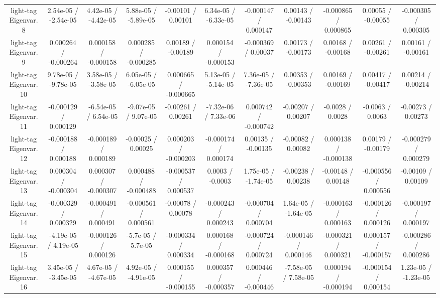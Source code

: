 \begin{table}[htbp]
\begin{center}
\begin{tabular}{|c|c|c|c|c|c|c|c|c|c|c|}
  light-tag Eigenvar. 8 & 2.54e-05 / -2.54e-05 & 4.42e-05 / -4.42e-05 & 5.88e-05 / -5.89e-05 & -0.00101 / 0.00101 & 6.34e-05 / -6.33e-05 & -0.000147 / 0.000147 & 0.00143 / -0.00143 & -0.000865 / 0.000865 & 0.00055 / -0.00055 & -0.000305 / 0.000305 \\ 
  light-tag Eigenvar. 9 & 0.000264 / -0.000264 & 0.000158 / -0.000158 & 0.000285 / -0.000285 & 0.00189 / -0.00189 & 0.000154 / -0.000153 & -0.000369 / 0.00037 & 0.00173 / -0.00173 & 0.00168 / -0.00168 & 0.00261 / -0.00261 & 0.00161 / -0.00161 \\ 
  light-tag Eigenvar. 10 & 9.78e-05 / -9.78e-05 & 3.58e-05 / -3.58e-05 & 6.05e-05 / -6.05e-05 & 0.000665 / -0.000665 & 5.13e-05 / -5.14e-05 & 7.36e-05 / -7.36e-05 & 0.00353 / -0.00353 & 0.00169 / -0.00169 & 0.00417 / -0.00417 & 0.00214 / -0.00214 \\ 
  light-tag Eigenvar. 11 & -0.000129 / 0.000129 & -6.54e-05 / 6.54e-05 & -9.07e-05 / 9.07e-05 & -0.00261 / 0.00261 & -7.32e-06 / 7.33e-06 & 0.000742 / -0.000742 & -0.00207 / 0.00207 & -0.0028 / 0.0028 & -0.0063 / 0.0063 & -0.00273 / 0.00273 \\ 
  light-tag Eigenvar. 12 & -0.000188 / 0.000188 & -0.000189 / 0.000189 & -0.00025 / 0.00025 & 0.000203 / -0.000203 & -0.000174 / 0.000174 & 0.00135 / -0.00135 & -0.00082 / 0.00082 & 0.000138 / -0.000138 & 0.00179 / -0.00179 & -0.000279 / 0.000279 \\ 
  light-tag Eigenvar. 13 & 0.000304 / -0.000304 & 0.000307 / -0.000307 & 0.000488 / -0.000488 & -0.000537 / 0.000537 & 0.0003 / -0.0003 & 1.75e-05 / -1.74e-05 & -0.00238 / 0.00238 & -0.00148 / 0.00148 & -0.000556 / 0.000556 & -0.00109 / 0.00109 \\ 
  light-tag Eigenvar. 14 & -0.000329 / 0.000329 & -0.000491 / 0.000491 & -0.000561 / 0.000561 & -0.00078 / 0.00078 & -0.000243 / 0.000243 & -0.000704 / 0.000704 & 1.64e-05 / -1.64e-05 & -0.000163 / 0.000163 & -0.000126 / 0.000126 & -0.000197 / 0.000197 \\ 
  light-tag Eigenvar. 15 & -4.19e-05 / 4.19e-05 & -0.000126 / 0.000126 & -5.7e-05 / 5.7e-05 & -0.000334 / 0.000334 & 0.000168 / -0.000168 & -0.000724 / 0.000724 & -0.000146 / 0.000146 & -0.000321 / 0.000321 & 0.000157 / -0.000157 & -0.000286 / 0.000286 \\ 
  light-tag Eigenvar. 16 & 3.45e-05 / -3.45e-05 & 4.67e-05 / -4.67e-05 & 4.92e-05 / -4.91e-05 & 0.000155 / -0.000155 & 0.000357 / -0.000357 & 0.000446 / -0.000446 & -7.58e-05 / 7.58e-05 & 0.000194 / -0.000194 & -0.000154 / 0.000154 & 1.23e-05 / -1.23e-05 \\ 

\end{tabular}
\end{center}
\end{table}
